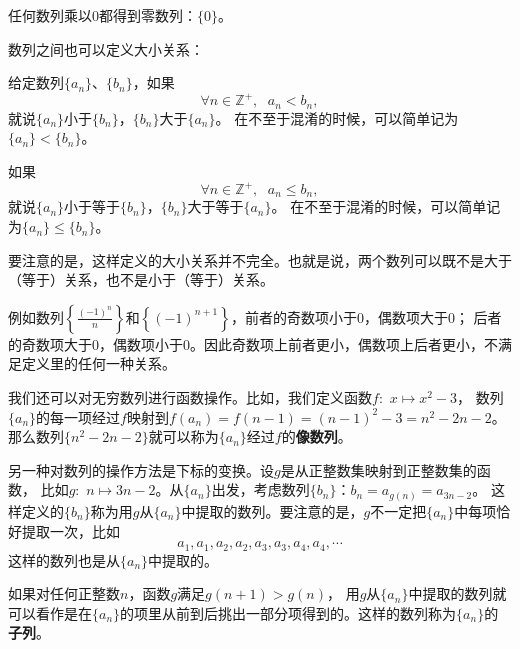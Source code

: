 \documentclass[12pt,UTF8]{ctexbook}
\begin{document}
任何数列乘以$0$都得到零数列：$\{0\}$。

数列之间也可以定义大小关系：
\begin{df}
    给定数列$\{a_n\}$、$\{b_n\}$，如果
    $$ \forall n\in \mathbb{Z}^+, \;\,\, a_n < b_n,$$
    就说$\{a_n\}$小于$\{b_n\}$，$\{b_n\}$大于$\{a_n\}$。
    在不至于混淆的时候，可以简单记为$\{a_n\} < \{b_n\}$。
    
    如果
    $$ \forall n\in \mathbb{Z}^+, \;\,\, a_n \leqslant b_n,$$
    就说$\{a_n\}$小于等于$\{b_n\}$，$\{b_n\}$大于等于$\{a_n\}$。
    在不至于混淆的时候，可以简单记为$\{a_n\} \leqslant \{b_n\}$。
\end{df}


要注意的是，这样定义的大小关系并不完全。也就是说，两个数列可以既不是大于（等于）关系，也不是小于（等于）关系。

例如数列$\left\{\frac{(-1)^n}{n}\right\}$和$\left\{(-1)^{n+1}\right\}$，前者的奇数项小于$0$，偶数项大于$0$；
后者的奇数项大于$0$，偶数项小于$0$。因此奇数项上前者更小，偶数项上后者更小，不满足定义里的任何一种关系。

我们还可以对无穷数列进行函数操作。比如，我们定义函数$f:\,\,x\mapsto x^2 - 3$，
数列$\{a_n\}$的每一项经过$f$映射到$f(a_n) = f(n-1) = (n-1)^2 - 3 = n^2 - 2n - 2$。
那么数列$\{n^2-2n-2\}$就可以称为$\{a_n\}$经过$f$的\textbf{像数列}。

另一种对数列的操作方法是下标的变换。设$g$是从正整数集映射到正整数集的函数，
比如$g:\,\, n \mapsto 3n - 2$。从$\{a_n\}$出发，考虑数列$\{b_n\}$：$b_n = a_{g(n)} = a_{3n-2}$。
这样定义的$\{b_n\}$称为用$g$从$\{a_n\}$中提取的数列。要注意的是，$g$不一定把$\{a_n\}$中每项恰好提取一次，比如
$$ a_1, a_1, a_2, a_2, a_3, a_3, a_4, a_4, \cdots $$
这样的数列也是从$\{a_n\}$中提取的。

如果对任何正整数$n$，函数$g$满足$g(n+1) > g(n)$，
用$g$从$\{a_n\}$中提取的数列就可以看作是在$\{a_n\}$的项里从前到后挑出一部分项得到的。这样的数列称为$\{a_n\}$的\textbf{子列}。
\end{document}
